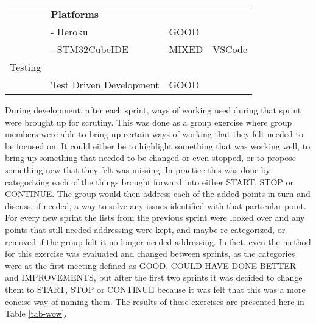 \begin{table}[htbp]
\begin{center}
{\begin{tabular}{llll}
                           & \textbf{Platforms}                &       &                                       \\
                           & - Heroku                          & \cellcolor{green} GOOD  &                                       \\
                           & - STM32CubeIDE                    & \cellcolor{yellow} MIXED & VSCode                                \\
\rowcolor{grey} Testing                    &                                   &       &                                       \\
                           & Test Driven Development           & \cellcolor{green} GOOD  &                                       \\ \hline
\end{tabular}%
}
\end{center}
\end{table}
During development, after each sprint, ways of working used during that sprint were brought up for scrutiny. This was done as a group exercise where group members were able to bring up certain ways of working that they felt needed to be focused on. It could either be to highlight something that was working well, to bring up something that needed to be changed or even stopped, or to propose something new that they felt was missing. In practice this was done by categorizing each of the things brought forward into either START, STOP or CONTINUE. The group would then address each of the added points in turn and discuss, if needed, a way to solve any issues identified with that particular point. For every new sprint the lists from the previous sprint were looked over and any points that still needed addressing were kept, and maybe re-categorized, or removed if the group felt it no longer needed addressing. In fact, even the method for this exercise was evaluated and changed between sprints, as the categories were at the first meeting defined as GOOD, COULD HAVE DONE BETTER and IMPROVEMENTS, but after the first two sprints it was decided to change them to START, STOP or CONTINUE because it was felt that this was a more concise way of naming them. The results of these exercises are presented here in Table \ref{tab-wow}.
